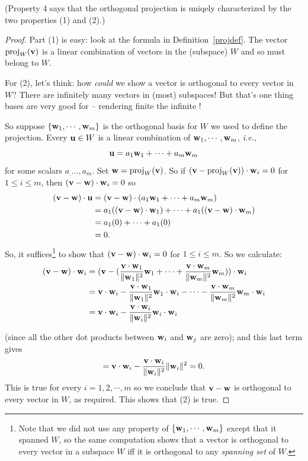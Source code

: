  

(Property 4 says that the orthogonal
projection is uniqely characterized by the two properties (1) and (2).)


\begin{proof} Part (1) is easy: look at the formula in Definition~\ref{projdef}. The vector $\operatorname{proj}_W(\mathbf{v})$ is a linear combination of vectors in the (subspace) $W$ and so must belong to $W$.

For (2), let's think: how {\it could} we  show 
a vector is orthogonal to every vector in $W$? There are infinitely many vectors in (most) subspaces! But that's one thing bases are very good for -- rendering finite  the infinite ! 

So suppose $\{\mathbf{w}_1, \cdots, \mathbf{w}_m\}$ is the orthogonal basis for $W$ we used to define the projection. Every $\mathbf{u}\in W$ is a linear combination of $ \mathbf{w}_1, \cdots, \mathbf{w}_m $, \emph{i.e.}, $$\mathbf{u} =a_1 \mathbf{w}_1 +\cdots + a_m \mathbf{w}_m$$ for some scalars $a_, \dots, a_m$. Set $\mathbf{w}=\operatorname{proj}_W(\mathbf{v})$.  So if $(\mathbf{v}-\operatorname{proj}_W(\mathbf{v}))\cdot \mathbf{w}_i=0$  for $1\le i \le m$, then $(\mathbf{v}-\mathbf{w})\cdot \mathbf{w}_i=0$ so
\begin{align*} 
(\mathbf{v}-\mathbf{w}) \cdot \mathbf{u} &=(\mathbf{v}-\mathbf{w})\cdot (a_1 \mathbf{w}_1 +\cdots + a_m \mathbf{w}_m) \\
&=a_1((\mathbf{v}-\mathbf{w})\cdot \mathbf{w}_1) +\cdots +a_1((\mathbf{v}-\mathbf{w})\cdot \mathbf{w}_m)\\
&=a_1(0) +\cdots +a_1(0)\\&=0.
\end{align*}
So, it suffices\footnote{Note that we did not use any property of $\{\mathbf{w}_1, \cdots, \mathbf{w}_m\}$ except that it spanned $W$, so the same computation shows that a vector is orthogonal to every vector in a subspace $W$ iff it is orthogonal to any {\it spanning set} of $W$.\label{CheckOrthogOnSpan} } to show that $(\mathbf{v}-\mathbf{w})\cdot \mathbf{w}_i=0$  for $1\le i \le m$.   So we calculate: 
\begin{align*}
 (\mathbf{v}-\mathbf{w})\cdot\mathbf{w}_i  &=
(\mathbf{v} - (\frac{\mathbf{v}\cdot \mathbf{w}_1}{\Vert \mathbf{w}_1\Vert^2}\mathbf{w}_1 + \cdots 
+ 
\frac{\mathbf{v}\cdot \mathbf{w}_m}{\Vert \mathbf{w}_m\Vert^2}\mathbf{w}_m))\cdot \mathbf{w}_i \\
 &= \mathbf{v} \cdot \mathbf{w}_i - \frac{\mathbf{v}\cdot \mathbf{w}_1}{\Vert \mathbf{w}_1\Vert^2}\mathbf{w}_1 \cdot \mathbf{w}_i - \cdots - \frac{\mathbf{v}\cdot \mathbf{w}_m}{\Vert \mathbf{w}_m\Vert^2}\mathbf{w}_m \cdot \mathbf{w}_i\\
&= \mathbf{v} \cdot \mathbf{w}_i - \frac{\mathbf{v}\cdot \mathbf{w}_i}{\Vert \mathbf{w}_i\Vert^2}\mathbf{w}_i \cdot \mathbf{w}_i
\end{align*}

(since all the other dot products between $\mathbf{w}_i$ and $\mathbf{w}_j$ are zero);
and this last term gives
$$
 = \mathbf{v} \cdot \mathbf{w}_i - \frac{\mathbf{v}\cdot \mathbf{w}_i}{\Vert \mathbf{w}_i\Vert^2}\Vert \mathbf{w}_i \Vert^2 = 0.
$$
This is true for every $i = 1,2,\cdots, m$ so we conclude that $\mathbf{v}-\mathbf{w}$ is orthogonal to every vector in $W$, as required. This shows that (2) is true.



\end{proof}
